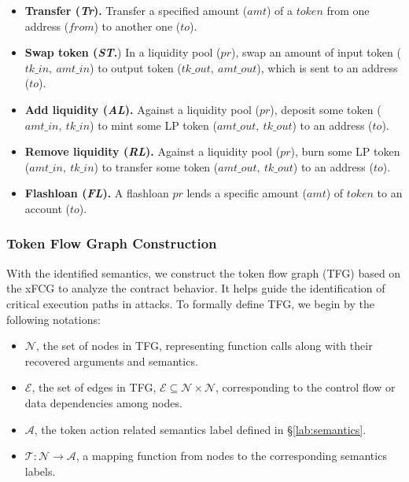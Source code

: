 \begin{itemize}
\item \textbf{Transfer (\textit{Tr}).} Transfer a specified amount ($amt$) of a $token$ from one address ($from$) to another one ($to$).
\item \textbf{Swap token (\textit{ST}.}) In a liquidity pool ($pr$), swap an amount of input token ($tk\_in,\ amt\_in$) to output token ($tk\_out,\ amt\_out$), which is sent to an address ($to$).
\item \textbf{Add liquidity (\textit{AL}).} Against a liquidity pool ($pr$), deposit some token ($amt\_in,\ tk\_in$) to mint some LP token ($amt\_out,\ tk\_out$) to an address ($to$).
\item \textbf{Remove liquidity (\textit{RL}).} Against a liquidity pool ($pr$), burn some LP token ($amt\_in,\ tk\_in$) to transfer some token ($amt\_out,\ tk\_out$) to an address ($to$).
\item \textbf{Flashloan (\textit{FL}).} A flashloan $pr$ lends a specific amount ($amt$) of $token$ to an account ($to$).
\end{itemize}

\subsubsection{Token Flow Graph Construction} 

With the identified semantics, we construct the token flow graph (TFG) based on the xFCG to analyze the contract behavior. It helps guide the identification of critical execution paths in attacks. To formally define TFG, we begin by the following notations:
\begin{itemize}
    \item $\mathcal{N}$, the set of nodes in TFG, representing function calls along with their recovered arguments and semantics.
    \item $\mathcal{E}$, the set of edges in TFG, $\mathcal{E}  \subseteq \mathcal{N} \times \mathcal{N} $, corresponding to the control flow or data dependencies among nodes.
    \item $\mathcal{A}$, the token action related semantics label defined in \S\ref{lab:semantics}.
    \item $\mathcal{T}:\mathcal{N} \rightarrow \mathcal{A}$, a mapping function from nodes to the corresponding semantics labels.
\end{itemize}


